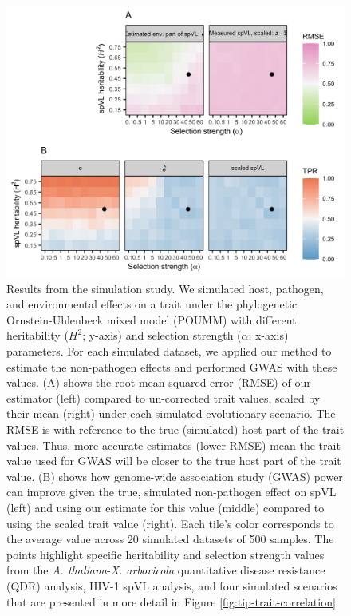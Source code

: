 \documentclass[11pt]{article}
\begin{document}
\begin{linenumbers}
\begin{figure}[H]
	\begin{center}
		\includegraphics[width=\linewidth]{figures/simulation_results}
		\caption{Results from the simulation study. We simulated host, pathogen, and environmental effects on a trait under the phylogenetic Ornstein-Uhlenbeck mixed model (POUMM) with different heritability ($H^2$; y-axis) and selection strength ($\alpha$; x-axis) parameters. For each simulated dataset, we applied our method to estimate the non-pathogen effects and performed GWAS with these values. (A) shows the root mean squared error (RMSE) of our estimator (left) compared to un-corrected trait values, scaled by their mean (right) under each simulated evolutionary scenario. The RMSE is with reference to the true (simulated) host part of the trait values. Thus, more accurate estimates (lower RMSE) mean the trait value used for GWAS will be closer to the true host part of the trait value. (B) shows how genome-wide association study (GWAS) power can improve given the true, simulated non-pathogen effect on spVL (left) and using our estimate for this value (middle) compared to using the scaled trait value (right). Each tile's color corresponds to the average value across 20 simulated datasets of 500 samples. The points highlight specific heritability and selection strength values from the \emph{A. thaliana}-\emph{X. arboricola} quantitative disease resistance (QDR) analysis, HIV-1 spVL analysis, and four simulated scenarios that are presented in more detail in Figure \ref{fig:tip-trait-correlation}.}
		\label{fig:simulationResults}
	\end{center}
\end{figure}


\end{linenumbers}
\end{document}
